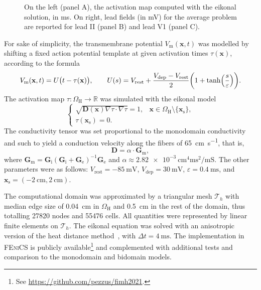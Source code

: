 \documentclass[runningheads]{llncs}
\newcommand{\Vm}{V_\mathrm{m}}
\newcommand{\vx}{\mathbf{x}}
\newcommand{\tG}{\mathbf{G}}
\newcommand{\tGi}{\tG_\mathrm{i}}
\newcommand{\tGe}{\tG_\mathrm{e}}
\newcommand{\tGm}{\tG_\mathrm{m}}
\newcommand{\OmegaH}{\Omega_\mathrm{H}}
\newcommand{\Vrest}{V_\mathrm{rest}}
\newcommand{\Vdepol}{V_\mathrm{dep}}
\begin{document}
\begin{figure}[tb]
    \caption{On the left (panel A), the activation map computed with the eikonal solution, in \si{\ms}. On right, lead fields (in \si{\milli\volt}) for the average problem are reported for lead II (panel B) and lead V1 (panel C).}
    \label{fig:activ}
\end{figure}

For sake of simplicity,
the transmembrane potential $\Vm(\vx,t)$ was modelled by shifting a fixed action
potential template at given activation times $\tau(\vx)$, according to the
formula
\[
\Vm(\vx,t) = U\bigl(t-\tau(\vx)\bigr),
\qquad
U(s) = \Vrest + \frac{\Vdepol-\Vrest}{2}
\biggl(1 + \tanh\Bigl(\frac{s}{\varepsilon}\Bigr) \biggr).
\]
The activation map $\tau\colon \OmegaH\to\mathbb{R}$ was simulated with the
eikonal model
\[
\begin{cases}
\sqrt{ \mathbf{D}(\vx)\nabla\tau\cdot\nabla\tau } = 1, 
& \vx\in\OmegaH\setminus\{ \vx_\mathrm{s} \}, \\
\tau(\vx_\mathrm{s}) = 0. &
\end{cases}
\]
The conductivity tensor was set proportional to the monodomain conductivity
and such to yield a conduction velocity along the fibers of
\SI{65}{\cm\per\s}, that is,
\[
\mathbf{D} = \alpha\cdot\tGm,
\]
where $\tGm = \tGi(\tGi+\tGe)^{-1}\tGe$ and $\alpha \approx \SI{2.82e-3}{\cm\tothe{4}\square\ms\per\milli\siemens}$.
The other parameters were as follows:
$\Vrest = \SI{-85}{\milli\volt}$,
$\Vdepol = \SI{30}{\milli\volt}$,
$\varepsilon = \SI{0.4}{\ms}$,
and $\vx_\mathrm{s} = (-\SI{2}{\cm},\SI{2}{\cm})$.

The computational domain was approximated by a triangular mesh $\mathcal{T}_h$
with median edge size of \SI{0.04}{\cm} in $\OmegaH$ and \SI{0.5}{\cm} in the rest of
the domain, thus totalling \num{27820} nodes and \num{55476} cells.
All quantities were represented by linear finite elements on $\mathcal{T}_h$.
The eikonal equation was solved with an anisotropic version of the heat distance
method~\cite{crane2013}, with $\Delta t = \SI{4}{\ms}$.
The implementation in \textsc{FEniCS} is publicly available\footnote{See \url{https://github.com/pezzus/fimh2021}.}
and complemented with additional tests and comparison to the monodomain
and bidomain models.
\end{document}
